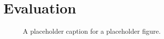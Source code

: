 \section{Evaluation}
\label{sec:eval}

\begin{figure}
  \centerline{}

\caption{A placeholder caption for a placeholder figure.}
\label{fig:placeholder}
\end{figure}
